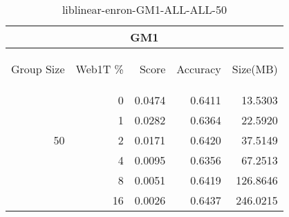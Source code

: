 \begin{center}
\begin{table}[htbp] 
 \begin{center}
\begin{tabular}{ | r | r | r | r | r |}
\hline
\multicolumn{5}{|c|}{GM1}\\
\hline
\begin{sideways}Group Size\end{sideways} & \begin{sideways}Web1T \%\end{sideways} & \begin{sideways}Score\end{sideways} & \begin{sideways}Accuracy\end{sideways} & \begin{sideways}Size(MB)\end{sideways}\\
\hline
\multirow{5}{*}{50}
 & 0 & 0.0474 & 0.6411 & 13.5303\\ \cline{2-5}
 & 1 & 0.0282 & 0.6364 & 22.5920\\ \cline{2-5}
 & 2 & 0.0171 & 0.6420 & 37.5149\\ \cline{2-5}
 & 4 & 0.0095 & 0.6356 & 67.2513\\ \cline{2-5}
 & 8 & 0.0051 & 0.6419 & 126.8646\\ \cline{2-5}
 & 16 & 0.0026 & 0.6437 & 246.0215\\ \cline{2-5}
\hline
\end{tabular}
\caption{liblinear-enron-GM1-ALL-ALL-50}
\label{table:liblinear-enron-GM1-ALL-ALL-50}
\end{center}
 \end{table}
\end{center}

